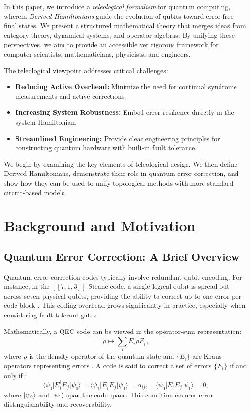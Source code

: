 \documentclass[11pt]{article}
\begin{document}
In this paper, we introduce a \emph{teleological formalism} for quantum computing, wherein \emph{Derived Hamiltonians} guide the evolution of qubits toward error-free final states. We present a structured mathematical theory that merges ideas from category theory, dynamical systems, and operator algebras. By unifying these perspectives, we aim to provide an accessible yet rigorous framework for computer scientists, mathematicians, physicists, and engineers.

The teleological viewpoint addresses critical challenges:
\begin{itemize}
\item \textbf{Reducing Active Overhead:} Minimize the need for continual syndrome measurements and active corrections.
\item \textbf{Increasing System Robustness:} Embed error resilience directly in the system Hamiltonian.
\item \textbf{Streamlined Engineering:} Provide clear engineering principles for constructing quantum hardware with built-in fault tolerance.
\end{itemize}

We begin by examining the key elements of teleological design. We then define Derived Hamiltonians, demonstrate their role in quantum error correction, and show how they can be used to unify topological methods with more standard circuit-based models.

\section{Background and Motivation}
\subsection{Quantum Error Correction: A Brief Overview}
Quantum error correction codes typically involve redundant qubit encoding. For instance, in the $[[7,1,3]]$ Steane code, a single logical qubit is spread out across seven physical qubits, providing the ability to correct up to one error per code block \cite{SteaneCode}. This coding overhead grows significantly in practice, especially when considering fault-tolerant gates.

Mathematically, a QEC code can be viewed in the operator-sum representation:
\begin{equation}
\rho \mapsto \sum_{i} E_i \rho E_i^\dagger,
\end{equation}
where $\rho$ is the density operator of the quantum state and $\{E_i\}$ are Kraus operators representing errors \cite{NielsenChuang}. A code is said to correct a set of errors $\{E_i\}$ if and only if \cite{KnillLaflamme}:
\begin{equation}
\langle \psi_0 \vert E_i^\dagger E_j \vert \psi_0 \rangle 
= 
\langle \psi_1 \vert E_i^\dagger E_j \vert \psi_1 \rangle 
= 
\alpha_{ij},
\quad
\langle \psi_0 \vert E_i^\dagger E_j \vert \psi_1 \rangle 
= 0,
\end{equation}
where $\ket{\psi_0}$ and $\ket{\psi_1}$ span the code space. This condition ensures error distinguishability and recoverability.
\end{document}
